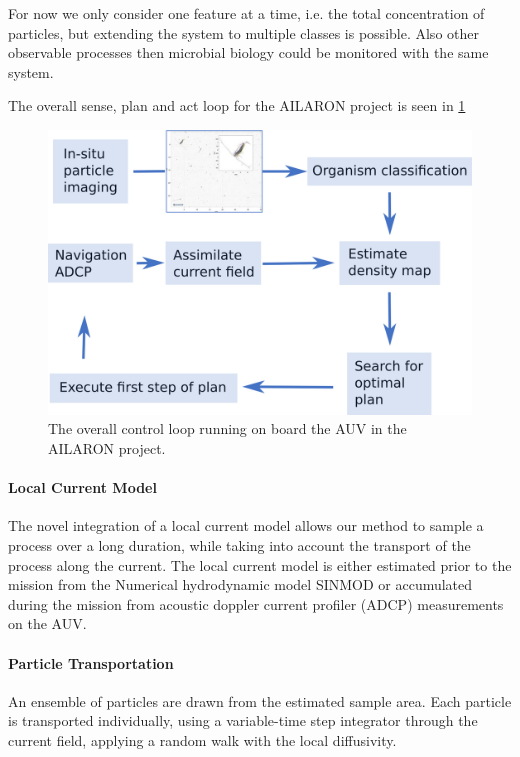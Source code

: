 \documentclass[conference]{IEEEtran}
\begin{document}
For now we only consider one feature at a time, i.e. the total concentration of particles, but extending the system to multiple classes is possible.
Also other observable processes then microbial biology could be monitored with the same system. 

The overall sense, plan and act loop for the AILARON project is seen in \cref{fig:sensePlanActLoop}

\begin{figure}[tbp]
\centerline{\includegraphics[width=0.9\linewidth]{figures/workflow-simplified.png}}
\caption{The overall control loop running on board the AUV in the AILARON project.}
\label{fig:sensePlanActLoop}
\end{figure}

\paragraph{Local Current Model}
The novel integration of a local current model allows our method to sample a process over a long duration, while taking into account the transport of the process along the current.
The local current model is either estimated prior to the mission from the Numerical hydrodynamic model SINMOD or accumulated during the mission from acoustic doppler current profiler (ADCP) measurements on the AUV.

\paragraph{Particle Transportation}
An ensemble of particles are drawn from the estimated sample area. 
Each particle is transported individually, using a variable-time step integrator through the current field, applying a random walk with the local diffusivity.
\end{document}
